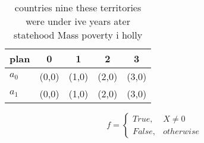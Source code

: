 \documentclass[a4paper]{article}
\begin{document}
\begin{table}
\begin{adjustbox}{width=0.5\columnwidth}
\begin{tabular}{|l|l|l|l|l|}
\hline
\textbf{plan} & \multicolumn{1}{c|}{\textbf{0}} & \multicolumn{1}{c|}{\textbf{1}} & \multicolumn{1}{c|}{\textbf{2}} & \multicolumn{1}{c|}{\textbf{3}} \\ \hline
\textbf{$a_0$}  & (0,0) & (1,0) & (2,0) & (3,0) \\ \hline
\textbf{$a_1$}  & (0,0) & (1,0) & (2,0) & (3,0) \\ \hline
\end{tabular}
\end{adjustbox}
\caption{countries nine these territories were under ive years ater statehood Mass poverty i holly
}
\end{table}

\begin{equation}   f =
\begin{cases} True, & X \neq 0\\
False, & otherwise
\end{cases}
\end{equation}
\end{document}

